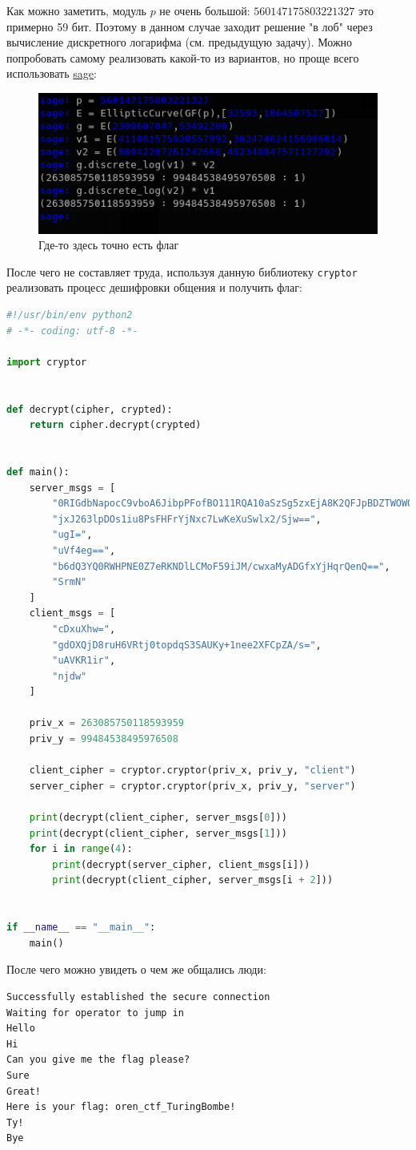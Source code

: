 \documentclass[idxtotoc,hyperref,openany,oneside]{files/crypto} %
\begin{document}
Как можно заметить, модуль $p$ не очень большой: $560147175803221327$ это примерно 59 бит. Поэтому в данном случае заходит решение "в лоб"{} через вычисление дискретного логарифма (см. предыдущую задачу). Можно попробовать самому реализовать какой-то из вариантов, но проще всего использовать \href{https://www.sagemath.org/}{sage}:
\begin{figure}[H]
\begin{center}
\includegraphics[width=1.0\linewidth]{files/sage}
\end{center}
\caption{Где-то здесь точно есть флаг}
\label{fig:chinese}
\end{figure}

После чего не составляет труда, используя данную библиотеку \verb|cryptor| реализовать процесс дешифровки общения и получить флаг:
\begin{lstlisting}[language=Python, caption=Секреты перестают быть таковыми]
#!/usr/bin/env python2
# -*- coding: utf-8 -*-

import cryptor


def decrypt(cipher, crypted):
    return cipher.decrypt(crypted)


def main():
    server_msgs = [
        "0RIGdbNapocC9vboA6JibpPFofBO111RQA10aSzSg5zxEjA8K2QFJpBDZTWOWQ==",
        "jxJ263lpDOs1iu8PsFHFrYjNxc7LwKeXuSwlx2/Sjw==",
        "ugI=",
        "uVf4eg==",
        "b6dQ3YQ0RWHPNE0Z7eRKNDlLCMoF59iJM/cwxaMyADGfxYjHqrQenQ==",
        "SrmN"
    ]
    client_msgs = [
        "cDxuXhw=",
        "gdOXQjD8ruH6VRtj0topdqS3SAUKy+1nee2XFCpZA/s=",
        "uAVKR1ir",
        "njdw"
    ]

    priv_x = 263085750118593959
    priv_y = 99484538495976508

    client_cipher = cryptor.cryptor(priv_x, priv_y, "client")
    server_cipher = cryptor.cryptor(priv_x, priv_y, "server")

    print(decrypt(client_cipher, server_msgs[0]))
    print(decrypt(client_cipher, server_msgs[1]))
    for i in range(4):
        print(decrypt(server_cipher, client_msgs[i]))
        print(decrypt(client_cipher, server_msgs[i + 2]))


if __name__ == "__main__":
    main()
\end{lstlisting}

После чего можно увидеть о чем же общались люди:
\begin{verbatim}
Successfully established the secure connection
Waiting for operator to jump in
Hello
Hi
Can you give me the flag please?
Sure
Great!
Here is your flag: oren_ctf_TuringBombe!
Ty!
Bye
\end{verbatim}

\end{document}

